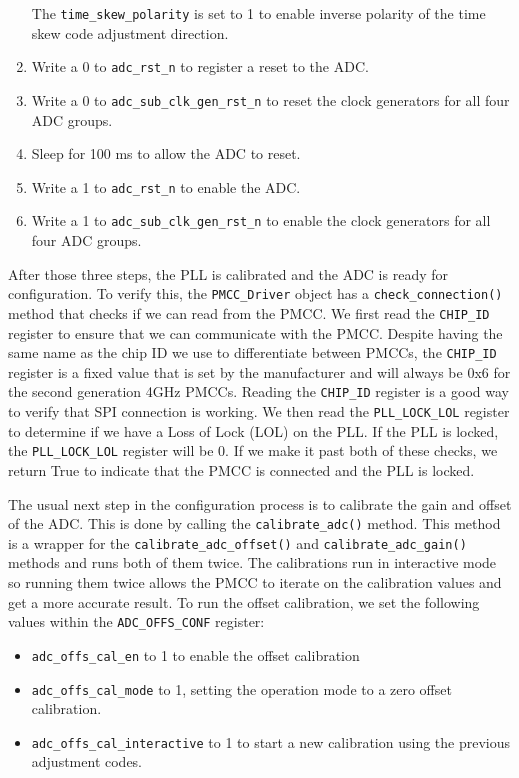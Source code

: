 \begin{enumerate}
        The \texttt{time\_skew\_polarity} is set to 1 to enable inverse polarity of the time skew code adjustment direction.
    \item 
        Write a 0 to \texttt{adc\_rst\_n} to register a reset to the ADC.
    \item 
        Write a 0 to \texttt{adc\_sub\_clk\_gen\_rst\_n} to reset the clock generators for all four ADC groups.
    \item 
        Sleep for 100 ms to allow the ADC to reset.
    \item 
        Write a 1 to \texttt{adc\_rst\_n} to enable the ADC.
    \item 
        Write a 1 to \texttt{adc\_sub\_clk\_gen\_rst\_n} to enable the clock generators for all four ADC groups.
\end{enumerate}

After those three steps, the PLL is calibrated and the ADC is ready for configuration.
To verify this, the \texttt{PMCC\_Driver} object has a \texttt{check\_connection()} method that checks if we can read from the PMCC.
We first read the \texttt{CHIP\_ID} register to ensure that we can communicate with the PMCC.
Despite having the same name as the chip ID we use to differentiate between PMCCs, the \texttt{CHIP\_ID} register is a fixed value that is set by the manufacturer and will always be 0x6 for the second generation 4GHz PMCCs.
Reading the \texttt{CHIP\_ID} register is a good way to verify that SPI connection is working.
We then read the \texttt{PLL\_LOCK\_LOL} register to determine if we have a Loss of Lock (LOL) on the PLL.
If the PLL is locked, the \texttt{PLL\_LOCK\_LOL} register will be 0.
If we make it past both of these checks, we return True to indicate that the PMCC is connected and the PLL is locked.

The usual next step in the configuration process is to calibrate the gain and offset of the ADC. 
This is done by calling the \texttt{calibrate\_adc()} method.
This method is a wrapper for the \texttt{calibrate\_adc\_offset()} and \texttt{calibrate\_adc\_gain()} methods and runs both of them twice.
The calibrations run in interactive mode so running them twice allows the PMCC to iterate on the calibration values and get a more accurate result.
To run the offset calibration, we set the following values within the \texttt{ADC\_OFFS\_CONF} register:

\begin{itemize}
    \item \texttt{adc\_offs\_cal\_en} to 1 to enable the offset calibration
    \item \texttt{adc\_offs\_cal\_mode} to 1, setting the operation mode to a zero offset calibration.
    \item \texttt{adc\_offs\_cal\_interactive} to 1 to start a new calibration using the previous adjustment codes. 
\end{itemize}


